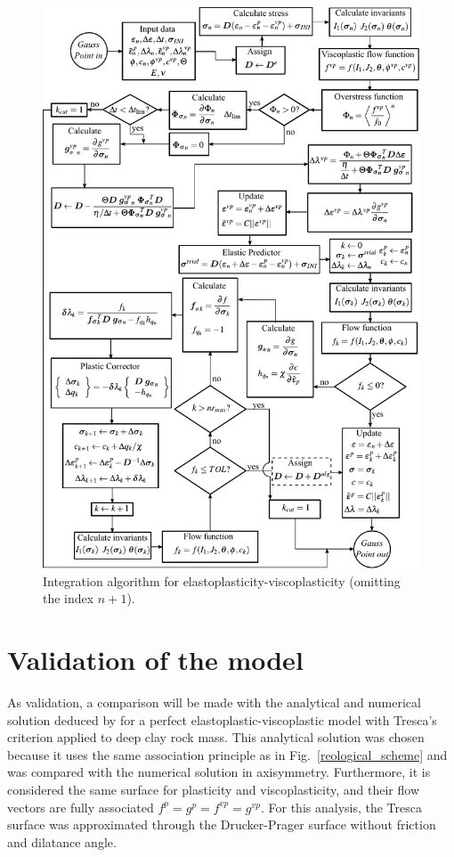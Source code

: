 \documentclass[Journal,letterpaper]{ascelike-new}
\begin{document}
\begin{figure}
	\centering
	\includegraphics[scale = 1.0]{integração EPVP.pdf}
	\caption{\label{integração EPVP}Integration algorithm for elastoplasticity-viscoplasticity (omitting the index $n+1$).}
\end{figure}

\section{Validation of the model}

As validation, a comparison will be made with the analytical and numerical solution deduced by \cite{piepi1995} for a perfect elastoplastic-viscoplastic model with Tresca’s criterion applied to deep clay rock mass. This analytical solution was chosen because it uses the same association principle as in Fig.~\ref{reological_scheme} and was compared with the numerical solution in axisymmetry. Furthermore, it is considered the same surface for plasticity and viscoplasticity, and their flow vectors are fully associated  $f^p = g^{p} = f^{vp} = g^{vp}$. For this analysis, the Tresca surface was approximated through the Drucker-Prager surface without friction and dilatance angle.
\end{document}
